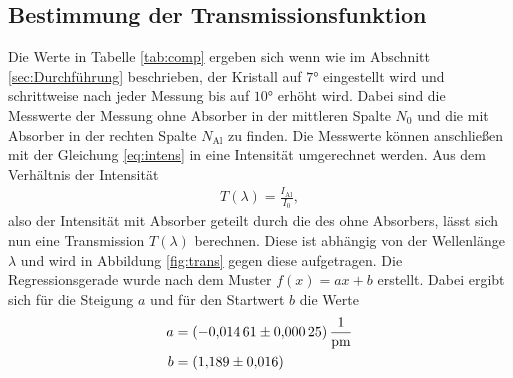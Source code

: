 \FloatBarrier

\subsection{Bestimmung der Transmissionsfunktion}
Die Werte in Tabelle \ref{tab:comp} ergeben sich wenn wie im Abschnitt \ref{sec:Durchführung} beschrieben, der Kristall auf $7\si{\degree}$ eingestellt wird und schrittweise nach jeder Messung bis auf $10\si{\degree}$ erhöht wird.
Dabei sind die Messwerte der Messung ohne Absorber in der mittleren Spalte $N_0$ und die mit Absorber in der rechten Spalte $N_\text{Al}$ zu finden.
Die Messwerte können anschließen mit der Gleichung \eqref{eq:intens} in eine Intensität umgerechnet werden.
Aus dem Verhältnis der Intensität
\begin{align*} 
T(\lambda) = \frac{I_\text{Al}}{I_0},
\end{align*}
also der Intensität mit Absorber geteilt durch die des ohne Absorbers, lässt sich nun eine Transmission $T(\lambda)$ berechnen.
Diese ist abhängig von der Wellenlänge $\lambda$ und wird in Abbildung \ref{fig:trans} gegen diese aufgetragen.
Die Regressionsgerade wurde nach dem Muster $f(x) = ax+b$ erstellt.
Dabei ergibt sich für die Steigung $a$ und für den Startwert $b$ die Werte
\begin{align*}
  a & =  \SI{-0.01461(25)}{\frac{1}{\pico\meter}} \\
  b & =   \SI{1.189(16)}{} \\
\end{align*}
